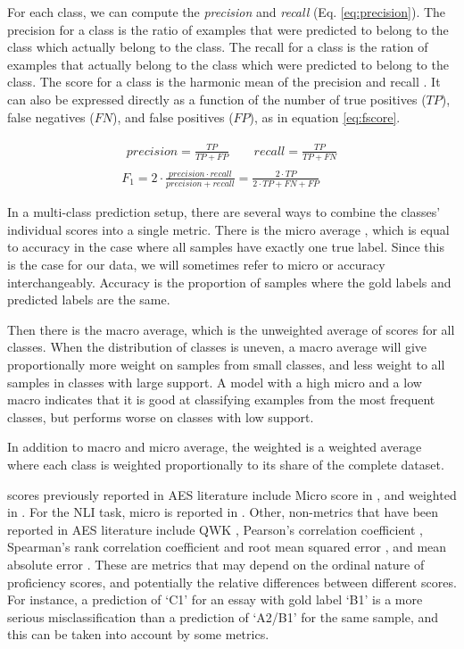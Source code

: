 For each class, we can compute the \emph{precision} and \emph{recall} (Eq.
\ref{eq:precision}). The precision for a class is the ratio of examples that
were predicted to belong to the class which actually belong to the class. The
recall for a class is the ration of examples that actually belong to the
class which were predicted to belong to the class. The \FI score for a class
is the harmonic mean of the precision and recall . It can also be expressed
directly as a function of the number of true positives ($TP$), false
negatives ($FN$), and false positives ($FP$), as in equation \ref{eq:fscore}.

\begin{gather}
  \begin{aligned}\label{eq:precision}
    precision = \frac{TP}{TP + FP} \qquad recall = \frac{TP}{TP + FN}
  \end{aligned}
  \\[2ex]
  F_1 = 2\cdot\frac{precision\cdot recall}{precision+recall}
      = {\frac{2\cdot TP}{2\cdot TP + FN + FP}}\label{eq:fscore}
\end{gather}

In a multi-class prediction setup, there are several ways to combine the
classes' individual \FI scores into a single metric. There is the micro
average \FI, which is equal to accuracy in the case where all samples have
exactly one true label. Since this is the case for our data, we will
sometimes refer to micro \FI or accuracy interchangeably. Accuracy is the
proportion of samples where the gold labels and predicted labels are the
same.

Then there is the macro average, which is the unweighted average of \FI
scores for all classes. When the distribution of classes is uneven, a macro
average will give proportionally more weight on samples from small classes,
and less weight to all samples in classes with large support. A model with a
high micro \FI and a low macro \FI indicates that it is good at classifying
examples from the most frequent classes, but performs worse on classes with
low support.

In addition to macro and micro average, the weighted \FI is a weighted
average where each class is weighted proportionally to its share of the
complete dataset.

\FI scores previously reported in \ac{AES} literature include Micro \FI score
in \textcite{vajjala17}, and weighted \FI in
\textcite{vajjala18universalCEFR}. For the \ac{NLI} task, micro \FI is
reported in \textcite{malmasi15,malmasi17}. Other, non-\FI metrics that have
been reported in \ac{AES} literature include \ac{QWK} \autocite{taghipour16,
alikaniotis2016automatic}, Pearson's correlation coefficient
\autocite{vajjala17, alikaniotis2016automatic}, Spearman's rank correlation
coefficient and root mean squared error \autocite{alikaniotis2016automatic},
and mean absolute error \autocite{vajjala17}. These are metrics that may
depend on the ordinal nature of proficiency scores, and potentially the
relative differences between different scores. For instance, a prediction of
`C1' for an essay with gold label `B1' is a more serious misclassification
than a prediction of `A2/B1' for the same sample, and this can be taken into
account by some metrics.

